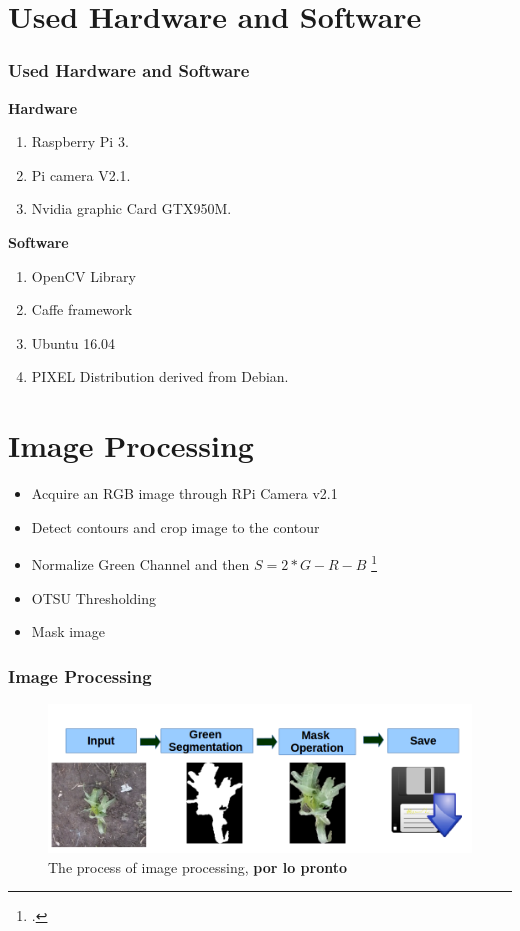 \documentclass[10pt,a4paper]{beamer}
\begin{document}
\section{Used Hardware and Software}
\begin{frame}
\frametitle{Used Hardware and Software}
\textbf{Hardware}
\begin{enumerate}
\item Raspberry Pi 3.
\item Pi camera V2.1.
\item Nvidia graphic Card GTX950M.
\end{enumerate}
\textbf{Software}
\begin{enumerate}
\item OpenCV Library
\item Caffe framework
\item Ubuntu 16.04
\item PIXEL Distribution derived from Debian.
\end{enumerate}
\end{frame}
\section{Image Processing}
\begin{frame}
\begin{itemize}
	\item Acquire  an RGB image through RPi Camera v2.1
	\item Detect contours and crop image to the contour
	\item Normalize Green Channel and then $S = 2*G - R - B$ \footcite{wang2013path}
	\item OTSU Thresholding
	\item Mask image
\end{itemize}
\frametitle{Image Processing}
	\begin{figure}[h]
	\centering
	\includegraphics[width=3.5 in]{procesamiento}
	\caption{The process of image processing,\textbf{ por lo pronto}}
	\label{figure4}
	\end{figure}
\end{frame}
\end{document}
